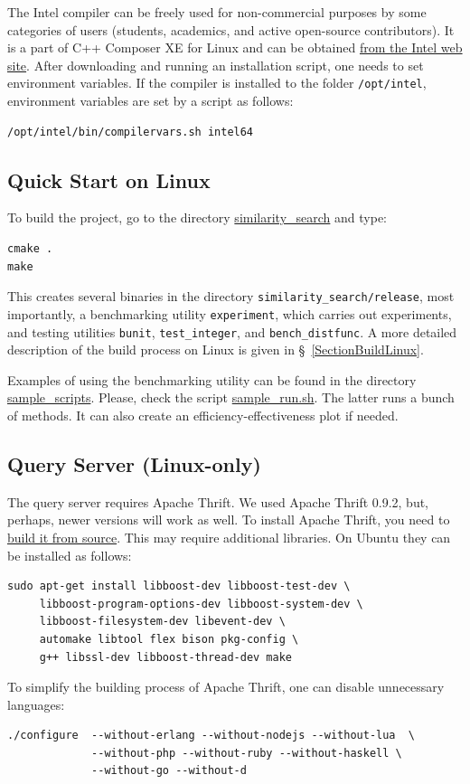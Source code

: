 \documentclass[runningheads,a4paper]{llncs}
\newcommand{\replocdir}{https://github.com/searchivarius/NonMetricSpaceLib/tree/pserv}
\newcommand{\replocfile}{https://github.com/searchivarius/NonMetricSpaceLib/blob/pserv/}
\newcommand{\ttt}[1]{\texttt{#1}}
\begin{document}
{The Intel compiler can be freely used for non-commercial purposes by some categories of users (students, academics,
and active open-source contributors).
It is a part of C++ Composer XE for Linux and can 
be obtained \href{http://software.intel.com/en-us/non-commercial-software-development}{from the Intel web site}.
After downloading and running an installation script, one needs to set environment variables.
If the compiler is installed to the folder \ttt{/opt/intel}, environment variables
are set by a script as follows:
\begin{verbatim}
/opt/intel/bin/compilervars.sh intel64
\end{verbatim}



\subsection{Quick Start on Linux}\label{QuickStartLinux}
To build the project, go to the directory \href{\replocdir similarity_search}{similarity\_search} and type:  
\begin{verbatim}
cmake .  
make   
\end{verbatim}
This creates several binaries in the directory \ttt{similarity\_search/release}, 
most importantly, 
a benchmarking utility \ttt{experiment}, which carries out experiments,
and testing utilities \ttt{bunit}, \ttt{test\_integer}, and \ttt{bench\_distfunc}.
A more detailed description of the build process on Linux is given in \S~\ref{SectionBuildLinux}.

Examples of using the benchmarking utility can be found in the directory \href{\replocdir sample_scripts}{sample\_scripts}. 
Please, check the script \href{\replocfile sample_scripts/sample_run.sh}{sample\_run.sh}. 
The latter runs a bunch of methods. It can also create an efficiency-effectiveness plot if needed.

\subsection{Query Server (Linux-only)}\label{SectionQueryServer}

The query server requires Apache Thrift. We used Apache Thrift 0.9.2, but, perhaps, newer versions will work as well.  
To install Apache Thrift, you need to \href{https://thrift.apache.org/docs/BuildingFromSource}{build it from source}.
This may require additional libraries. On Ubuntu they can be installed as follows:
\begin{verbatim}
sudo apt-get install libboost-dev libboost-test-dev \ 
     libboost-program-options-dev libboost-system-dev \
     libboost-filesystem-dev libevent-dev \
     automake libtool flex bison pkg-config \
     g++ libssl-dev libboost-thread-dev make
\end{verbatim}
To simplify the building process of Apache Thrift, one can disable unnecessary languages:
\begin{verbatim}
./configure  --without-erlang --without-nodejs --without-lua  \
             --without-php --without-ruby --without-haskell \
             --without-go --without-d 
\end{verbatim}

}
\end{document}
